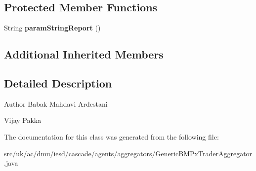 \subsection*{Protected Member Functions}
\begin{DoxyCompactItemize}
\item 
\hypertarget{classuk_1_1ac_1_1dmu_1_1iesd_1_1cascade_1_1agents_1_1aggregators_1_1_generic_b_m_px_trader_aggregator_a3b4800c0deacc7141cdd56ed33b36275}{String {\bfseries param\-String\-Report} ()}\label{classuk_1_1ac_1_1dmu_1_1iesd_1_1cascade_1_1agents_1_1aggregators_1_1_generic_b_m_px_trader_aggregator_a3b4800c0deacc7141cdd56ed33b36275}

\end{DoxyCompactItemize}
\subsection*{Additional Inherited Members}


\subsection{Detailed Description}
\begin{DoxyAuthor}{Author}
Babak Mahdavi Ardestani 

Vijay Pakka 
\end{DoxyAuthor}


The documentation for this class was generated from the following file\-:\begin{DoxyCompactItemize}
\item 
src/uk/ac/dmu/iesd/cascade/agents/aggregators/Generic\-B\-M\-Px\-Trader\-Aggregator.\-java\end{DoxyCompactItemize}
